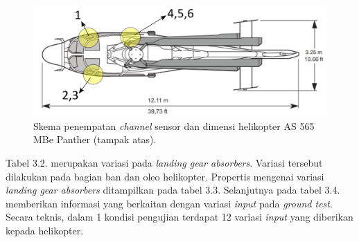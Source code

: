 \begin{figure}[H]
	\centering
	\includegraphics[width=0.77\linewidth]{gambar/tampak_atas.png}
	\caption{Skema penempatan \textit{channel} sensor dan dimensi helikopter AS 565 MBe Panther (tampak atas).}
	\label{tampak_atas.png}
\end{figure}

Tabel 3.2. merupakan variasi pada \textit{landing gear absorbers}. Variasi tersebut dilakukan pada bagian ban dan oleo helikopter. Propertis mengenai variasi \textit{landing gear absorbers} ditampilkan pada tabel 3.3. Selanjutnya pada tabel 3.4. memberikan informasi yang berkaitan dengan variasi \textit{input} pada \textit{ground test}. Secara teknis, dalam 1 kondisi pengujian terdapat 12 variasi \textit{input} yang diberikan kepada helikopter. 

